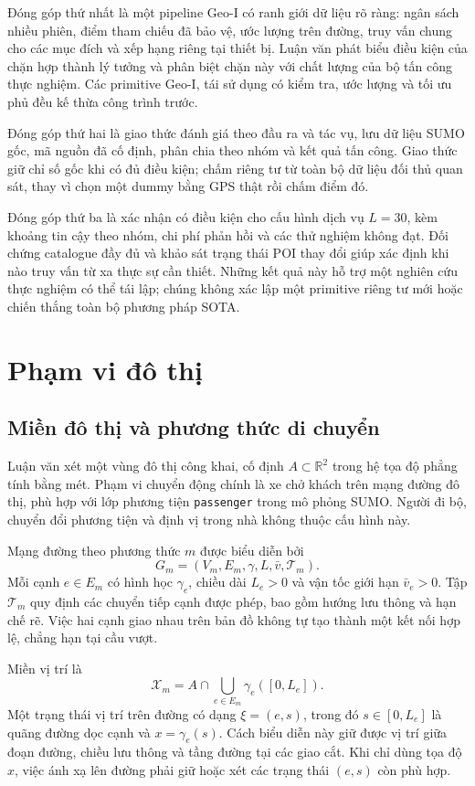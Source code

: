 \documentclass[12pt,a4paper,oneside]{report}
\begin{document}
Đóng góp thứ nhất là một pipeline Geo-I có ranh giới dữ liệu rõ ràng: ngân sách nhiều phiên, điểm tham chiếu đã bảo vệ, ước lượng trên đường, truy vấn chung cho các mục đích và xếp hạng riêng tại thiết bị. Luận văn phát biểu điều kiện của chặn hợp thành lý tưởng và phân biệt chặn này với chất lượng của bộ tấn công thực nghiệm. Các primitive Geo-I, tái sử dụng có kiểm tra, ước lượng và tối ưu phủ đều kế thừa công trình trước.

Đóng góp thứ hai là giao thức đánh giá theo đầu ra và tác vụ, lưu dữ liệu SUMO gốc, mã nguồn đã cố định, phân chia theo nhóm và kết quả tấn công. Giao thức giữ chỉ số gốc khi có đủ điều kiện; chấm riêng tư từ toàn bộ dữ liệu đối thủ quan sát, thay vì chọn một dummy bằng GPS thật rồi chấm điểm đó.

Đóng góp thứ ba là xác nhận có điều kiện cho cấu hình dịch vụ $L=30$, kèm khoảng tin cậy theo nhóm, chi phí phản hồi và các thử nghiệm không đạt. Đối chứng catalogue đầy đủ và khảo sát trạng thái POI thay đổi giúp xác định khi nào truy vấn từ xa thực sự cần thiết. Những kết quả này hỗ trợ một nghiên cứu thực nghiệm có thể tái lập; chúng không xác lập một primitive riêng tư mới hoặc chiến thắng toàn bộ phương pháp SOTA.

\chapter{Phạm vi đô thị}
\label{ch:urban}

\section{Miền đô thị và phương thức di chuyển}

Luận văn xét một vùng đô thị công khai, cố định $A\subset\mathbb R^2$ trong hệ tọa độ phẳng tính bằng mét. Phạm vi chuyển động chính là xe chở khách trên mạng đường đô thị, phù hợp với lớp phương tiện \texttt{passenger} trong mô phỏng SUMO. Người đi bộ, chuyển đổi phương tiện và định vị trong nhà không thuộc cấu hình này.

Mạng đường theo phương thức $m$ được biểu diễn bởi
\[
G_m=(V_m,E_m,\gamma,L,\bar v,\mathcal T_m).
\]
Mỗi cạnh $e\in E_m$ có hình học $\gamma_e$, chiều dài $L_e>0$ và vận tốc giới hạn $\bar v_e>0$. Tập $\mathcal T_m$ quy định các chuyển tiếp cạnh được phép, bao gồm hướng lưu thông và hạn chế rẽ. Việc hai cạnh giao nhau trên bản đồ không tự tạo thành một kết nối hợp lệ, chẳng hạn tại cầu vượt.

Miền vị trí là
\begin{equation}
\mathcal X_m=A\cap\bigcup_{e\in E_m}\gamma_e([0,L_e]).
\label{eq:urban-domain}
\end{equation}
Một trạng thái vị trí trên đường có dạng $\xi=(e,s)$, trong đó $s\in[0,L_e]$ là quãng đường dọc cạnh và $x=\gamma_e(s)$. Cách biểu diễn này giữ được vị trí giữa đoạn đường, chiều lưu thông và tầng đường tại các giao cắt. Khi chỉ dùng tọa độ $x$, việc ánh xạ lên đường phải giữ hoặc xét các trạng thái $(e,s)$ còn phù hợp.
\end{document}
